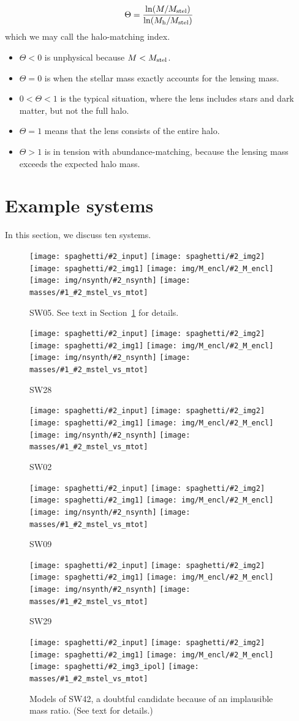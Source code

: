 \documentclass[fleqn,usenatbib]{mnras}
\newcommand{\inclfig}[2]{
  \centering
	\texttt{[image: spaghetti/\#2\_input]}%
	\texttt{[image: spaghetti/\#2\_img2]}
	\texttt{[image: spaghetti/\#2\_img1]}%
	\texttt{[image: img/M\_encl/\#2\_M\_encl]}
	\texttt{[image: spaghetti/\#2\_img3\_ipol]}%
	\texttt{[image: masses/\#1\_\#2\_mstel\_vs\_mtot]}
}
\newcommand{\inclfign}[2]{
  \centering
	\texttt{[image: spaghetti/\#2\_input]}%
	\texttt{[image: spaghetti/\#2\_img2]}
	\texttt{[image: spaghetti/\#2\_img1]}%
	\texttt{[image: img/M\_encl/\#2\_M\_encl]}
	\texttt{[image: img/nsynth/\#2\_nsynth]}%
	\texttt{[image: masses/\#1\_\#2\_mstel\_vs\_mtot]}
}
\newcommand{\Mstel}{M_{\rm stel}}
\newcommand{\Mhalo}{M_{\rm h}}
\begin{document}
\begin{equation}
\Theta = \frac{\ln(M/\Mstel)}{\ln(\Mhalo/\Mstel)}
\end{equation}
which we may call the halo-matching index.
\begin{itemize}
\item $\Theta < 0$ is unphysical because $M<\Mstel$.
\item $\Theta = 0$ is when the stellar mass exactly accounts for the
  lensing mass.
\item $0 < \Theta < 1$ is the typical situation, where the lens
  includes stars and dark matter, but not the full halo.
\item $\Theta = 1$ means that the lens consists of the entire halo.
\item $\Theta > 1$ is in tension with abundance-matching, because the
  lensing mass exceeds the expected halo mass.
\end{itemize}


\section{Example systems}\label{sec:examples}

In this section, we discuss ten systems.

\begin{figure}
  \inclfign{SW05}{ASW0007k4r_AJIBCHQ6EM}
  \caption{SW05.  See text in Section~\ref{sec:examples} for details.}
  \label{fig:SW05}
\end{figure}

\begin{figure}
  \inclfign{SW28}{ASW0007xrs_JHC3J2HYV7}
  \caption{SW28}
  \label{fig:SW28}
\end{figure}

\begin{figure}
  \inclfign{SW02}{ASW000619d_011489}
  \caption{SW02}
  \label{fig:SW02}
\end{figure}

\begin{figure}
  \inclfign{SW09}{ASW0002asp_5EKMWWVJHL}
  \caption{SW09}
  \label{fig:SW09}
\end{figure}

\begin{figure}
  \inclfign{SW29}{ASW0008qsm_TOFS7JNGEK}
  \caption{SW29}
  \label{fig:SW29}
\end{figure}

\begin{figure}
  \inclfig{SW42}{ASW00096rm_4Q3YCEWGLN}
  \caption{Models of SW42, a doubtful candidate because of an
    implausible mass ratio. (See text for details.)}
  \label{fig:SW42}
\end{figure}
\end{document}
